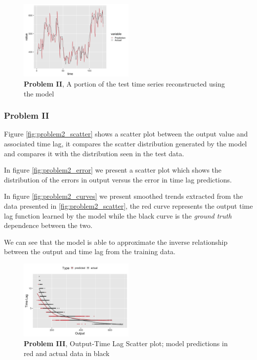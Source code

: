 \documentclass[twoside]{article}
\begin{document}
\begin{figure}[h]
\vspace{.3in}
\centerline{\includegraphics[width=0.5\textwidth]{figures/exp2_timeseries_pred.png}}
\vspace{.3in}
\caption{\textbf{Problem II}, A portion of the test time series reconstructed using the model}
\label{fig:problem2_timeseries}
\end{figure}


\subsubsection{Problem II}

Figure \ref{fig:problem2_scatter} shows a scatter plot between the output value and associated time lag, it compares the scatter distribution generated by the model and compares it with the distribution seen in the test data.

In figure \ref{fig:problem2_error} we present a scatter plot which shows the distribution of the errors in output versus the error in time lag predictions.

In figure \ref{fig:problem2_curves} we present smoothed trends extracted from the data presented in \ref{fig:problem2_scatter}, the red curve represents the output time lag function learned by the model while the black curve is the \emph{ground truth} dependence between the two. 

We can see that the model is able to approximate the inverse relationship between the output and time lag from the training data.

\begin{figure}[h]
\vspace{.3in}
\centerline{\includegraphics[width=0.5\textwidth]{figures/exp3_scatter_v_tl.png}}
\vspace{.3in}
\caption{\textbf{Problem III}, Output-Time Lag Scatter plot; model predictions in red and actual data in black}
\label{fig:problem3_scatter}
\end{figure}
\end{document}
